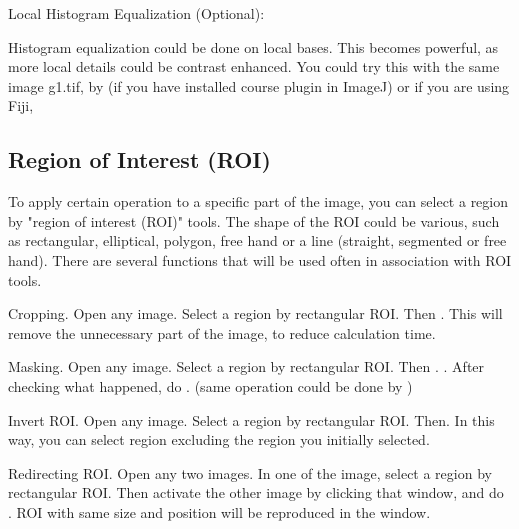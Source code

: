 \begin{indentexercise}{3}
Local Histogram Equalization (Optional):
\item Histogram equalization could be done on local bases. This becomes
powerful, as more local details could be contrast enhanced. You could
try this with the same image g1.tif, by  (if you have installed course plugin in ImageJ) or if you are using Fiji, 
\end{indentexercise}



\subsection{Region of Interest (ROI) }
\label{subsec:roi}
To apply certain operation to a specific part of the image, you can
select a region by "region of interest
(ROI)" tools. The shape of the ROI could be various,
such as rectangular, elliptical, polygon, free hand or a line
(straight, segmented or free hand). There are several functions that
will be used often in association with ROI tools. 

\begin{indentexercise}{1}
Cropping. Open any image. Select a region by
rectangular ROI. Then . This will
remove the unnecessary part of the image, to reduce calculation time.
\end{indentexercise}

\begin{indentexercise}{2}
Masking. Open any image. Select a region by
rectangular ROI. Then .
. After checking what
happened, do . (same operation could
be done by )
\end{indentexercise}

\begin{indentexercise}{3}
Invert ROI. Open any image. Select a region by
rectangular ROI. Then. In this way, you can select region
excluding the region you initially selected.
\end{indentexercise}

\begin{indentexercise}{4}
Redirecting ROI. Open any two images. In one
of the image, select a region by rectangular ROI. Then activate the
other image by clicking that window, and do . ROI with
same size and position will be reproduced in the window. 
\end{indentexercise}



